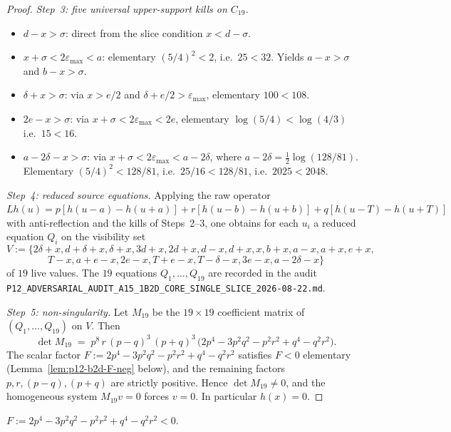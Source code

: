 \begin{proof}
\smallskip
\noindent\emph{Step~3: five universal upper-support kills on $C_{19}$.}
\begin{itemize}
\item[(H1)] $d - x > \sigma$: direct from the slice condition $x < d - \sigma$.
\item[(H2)] $x + \sigma < 2\varepsilon_{\max} < a$: elementary
  $(5/4)^{2} < 2$, i.e.\ $25 < 32$.  Yields $a - x > \sigma$
  and $b - x > \sigma$.
\item[(H3)] $\delta + x > \sigma$: via $x > e/2$ and
  $\delta + e/2 > \varepsilon_{\max}$, elementary $100 < 108$.
\item[(H4)] $2e - x > \sigma$: via $x + \sigma < 2\varepsilon_{\max} <
  2e$, elementary $\log(5/4) < \log(4/3)$ i.e.\ $15 < 16$.
\item[(H5)] $a - 2\delta - x > \sigma$: via
  $x + \sigma < 2\varepsilon_{\max} < a - 2\delta$, where
  $a - 2\delta = \tfrac12 \log(128/81)$.  Elementary
  $(5/4)^{2} < 128/81$, i.e.\ $25/16 < 128/81$, i.e.\
  $2025 < 2048$.
\end{itemize}

\smallskip
\noindent\emph{Step~4: reduced source equations.}  Applying the raw
operator $L h(u) = p[h(u-a) - h(u+a)] + r[h(u-b) - h(u+b)] +
q[h(u-T) - h(u+T)]$ with anti-reflection and the kills of
Steps~2--3, one obtains for each $u_{i}$ a reduced equation
$Q_{i}$ on the visibility set
\[
V := \{2\delta{+}x, d{+}\delta{+}x, \delta{+}x, 3d{+}x, 2d{+}x, d{-}x,
d{+}x, x, b{+}x, a{-}x, a{+}x, e{+}x,
\]
\[
T{-}x, a{+}e{-}x, 2e{-}x, T{+}e{-}x, T{-}\delta{-}x, 3e{-}x, a{-}2\delta{-}x\}
\]
of $19$ live values.  The $19$ equations
$Q_{1}, \ldots, Q_{19}$ are recorded in the audit
\texttt{P12\_ADVERSARIAL\_AUDIT\_A15\_1B2D\_CORE\_SINGLE\_SLICE\_2026-08-22.md}.

\smallskip
\noindent\emph{Step~5: non-singularity.}  Let $M_{19}$ be the
$19 \times 19$ coefficient matrix of $(Q_{1}, \ldots, Q_{19})$ on
$V$.  Then
\[
\det M_{19} \;=\; p^{8}\, r\, (p - q)^{3}\, (p + q)^{3}\,
\bigl(2p^{4} - 3 p^{2} q^{2} - p^{2} r^{2} + q^{4} - q^{2} r^{2}\bigr).
\]
The scalar factor
$F := 2p^{4} - 3 p^{2} q^{2} - p^{2} r^{2} + q^{4} - q^{2} r^{2}$
satisfies $F < 0$ elementary
(Lemma~\ref{lem:p12-b2d-F-neg} below), and the remaining factors
$p, r, (p-q), (p+q)$ are strictly positive.  Hence
$\det M_{19} \ne 0$, and the homogeneous system $M_{19} v = 0$
forces $v = 0$.  In particular $h(x) = 0$.
\end{proof}

\begin{lemma}[Elementary $F < 0$]
\label{lem:p12-b2d-F-neg}
$F := 2p^{4} - 3 p^{2} q^{2} - p^{2} r^{2} + q^{4} - q^{2} r^{2} < 0$.
\end{lemma}

